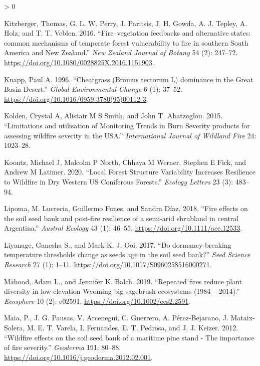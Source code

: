 \documentclass[
  12pt,
]{article}
\newlength{\cslhangindent}
\newenvironment{CSLReferences}[2] %
 {%
  \setlength{\parindent}{0pt}
  \ifodd #1 \everypar{\setlength{\hangindent}{\cslhangindent}}\ignorespaces\fi
  \ifnum #2 > 0
  \setlength{\parskip}{#2\baselineskip}
  \fi
 }%
 {}
\begin{document}
\begin{CSLReferences}{1}{0}
\leavevmode\hypertarget{ref-Kitzberger2016}{}%
Kitzberger, Thomas, G. L. W. Perry, J. Paritsis, J. H. Gowda, A. J.
Tepley, A. Holz, and T. T. Veblen. 2016. {``{Fire--vegetation feedbacks
and alternative states: common mechanisms of temperate forest
vulnerability to fire in southern South America and New Zealand}.''}
\emph{New Zealand Journal of Botany} 54 (2): 247--72.
\url{https://doi.org/10.1080/0028825X.2016.1151903}.

\leavevmode\hypertarget{ref-Knapp1996}{}%
Knapp, Paul A. 1996. {``{Cheatgrass (Bromus tectorum L) dominance in the
Great Basin Desert}.''} \emph{Global Environmental Change} 6 (1):
37--52. \url{https://doi.org/10.1016/0959-3780(95)00112-3}.

\leavevmode\hypertarget{ref-Kolden2015}{}%
Kolden, Crystal A, Alistair M S Smith, and John T. Abatzoglou. 2015.
{``{Limitations and utilisation of Monitoring Trends in Burn Severity
products for assessing wildfire severity in the USA}.''}
\emph{International Journal of Wildland Fire} 24: 1023--28.

\leavevmode\hypertarget{ref-Koontz2020}{}%
Koontz, Michael J, Malcolm P North, Chhaya M Werner, Stephen E Fick, and
Andrew M Latimer. 2020. {``Local Forest Structure Variability Increases
Resilience to Wildfire in Dry Western US Coniferous Forests.''}
\emph{Ecology Letters} 23 (3): 483--94.

\leavevmode\hypertarget{ref-Lipoma2018}{}%
Lipoma, M. Lucrecia, Guillermo Funes, and Sandra Díaz. 2018. {``{Fire
effects on the soil seed bank and post-fire resilience of a semi-arid
shrubland in central Argentina}.''} \emph{Austral Ecology} 43 (1):
46--55. \url{https://doi.org/10.1111/aec.12533}.

\leavevmode\hypertarget{ref-Liyanage2017}{}%
Liyanage, Ganesha S., and Mark K. J. Ooi. 2017. {``{Do dormancy-breaking
temperature thresholds change as seeds age in the soil seed bank?}''}
\emph{Seed Science Research} 27 (1): 1--11.
\url{https://doi.org/10.1017/S0960258516000271}.

\leavevmode\hypertarget{ref-Mahood2019}{}%
Mahood, Adam L., and Jennifer K. Balch. 2019. {``{Repeated fires reduce
plant diversity in low-elevation Wyoming big sagebrush ecosystems (1984
-- 2014)}.''} \emph{Ecosphere} 10 (2): e02591.
\url{https://doi.org/10.1002/ecs2.2591}.

\leavevmode\hypertarget{ref-Maia2012}{}%
Maia, P., J. G. Pausas, V. Arcenegui, C. Guerrero, A. Pérez-Bejarano, J.
Mataix-Solera, M. E. T. Varela, I. Fernandes, E. T. Pedrosa, and J. J.
Keizer. 2012. {``{Wildfire effects on the soil seed bank of a maritime
pine stand - The importance of fire severity}.''} \emph{Geoderma} 191:
80--88. \url{https://doi.org/10.1016/j.geoderma.2012.02.001}.


\end{CSLReferences}
\end{document}
